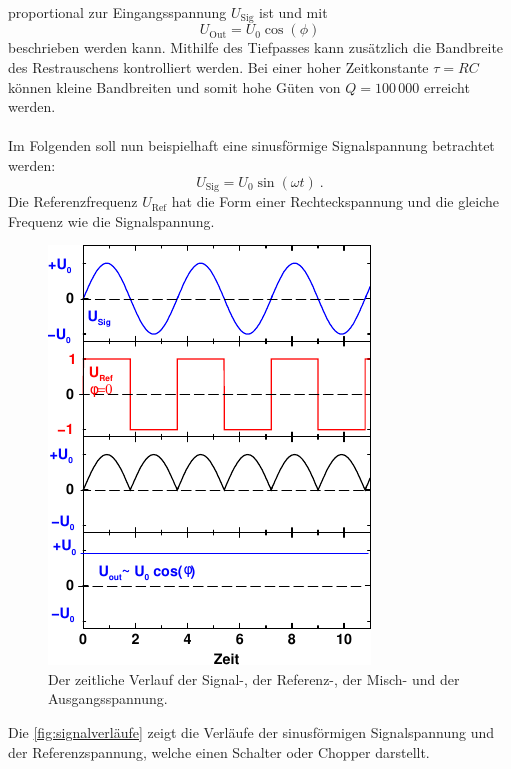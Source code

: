     proportional zur Eingangsspannung $U_\text{Sig}$ ist und mit
    \begin{equation*}
        U_\text{Out} = U_0 \cos{(\phi)}
    \end{equation*}
    beschrieben werden kann.
    Mithilfe des Tiefpasses kann zusätzlich die Bandbreite des Restrauschens kontrolliert werden.
    Bei einer hoher Zeitkonstante $\tau = RC$ können kleine Bandbreiten und somit hohe Güten von $𝑄 = 100\,000$ erreicht werden.\\
    \\
    Im Folgenden soll nun beispielhaft eine sinusförmige Signalspannung betrachtet werden:
    \begin{equation*}
        U_\text{Sig} = U_0 \sin{(\omega t)} \ .
    \end{equation*}
    Die Referenzfrequenz $U_\text{Ref}$ hat die Form einer Rechteckspannung
    und die gleiche Frequenz wie die Signalspannung.
    \begin{figure}[H]
        \centering
        \includegraphics[scale=0.9]{content/img/Abb_2.pdf}
        \caption{Der zeitliche Verlauf der Signal-, der Referenz-, der Misch- und der Ausgangsspannung. \cite{versuchsanleitung}}
        \label{fig:signalverläufe}
    \end{figure}
    Die \autoref{fig:signalverläufe} zeigt die Verläufe der sinusförmigen Signalspannung und der Referenzspannung,
    welche einen Schalter oder Chopper darstellt.
